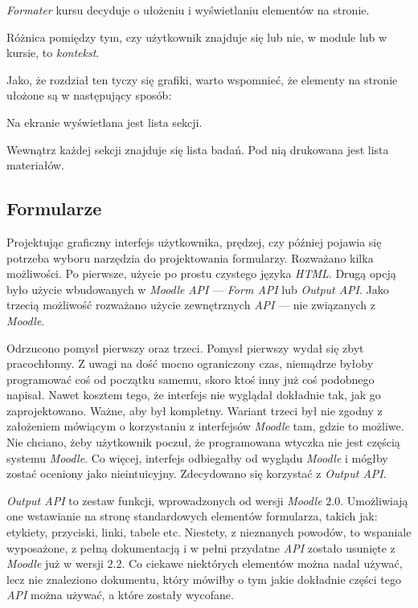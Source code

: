 \documentclass[12pt]{article}
\begin{document}
\emph{Formater} kursu decyduje o ułożeniu i wyświetlaniu elementów na stronie.

Różnica pomiędzy tym, czy użytkownik znajduje się lub nie, w module lub w kursie, to \emph{kontekst}.

Jako, że rozdział ten tyczy się grafiki, warto wspomnieć, że elementy na stronie ułożone są w następujący sposób:
\begin{description}
\item Na ekranie wyświetlana jest lista sekcji.
\item Wewnątrz każdej sekcji znajduje się lista badań. Pod nią drukowana jest lista materiałów.
\end{description}

\subsection{Formularze}
Projektując graficzny interfejs użytkownika, prędzej, czy później pojawia się potrzeba wyboru narzędzia do projektowania formularzy. Rozważano kilka możliwości. Po pierwsze, użycie po prostu czystego języka \emph{HTML}. Drugą opcją było użycie wbudowanych w \emph{Moodle} \emph{API} --- \emph{Form API} lub \emph{Output API}. Jako trzecią możliwość rozważano użycie zewnętrznych \emph{API} --- nie związanych z \emph{Moodle}.

Odrzucono pomysł pierwszy oraz trzeci. Pomysł pierwszy wydał się zbyt pracochłonny. Z uwagi na dość mocno ograniczony czas, niemądrze byłoby programować coś od początku samemu, skoro ktoś inny już coś podobnego napisał. Nawet kosztem tego, że interfejs nie wyglądał dokładnie tak, jak go zaprojektowano. Ważne, aby był kompletny. Wariant trzeci był nie zgodny z założeniem mówiącym o korzystaniu z interfejsów \emph{Moodle} tam, gdzie to możliwe. Nie chciano, żeby użytkownik poczuł, że programowana wtyczka nie jest częścią systemu \emph{Moodle}. Co więcej, interfejs odbiegałby od wyglądu \emph{Moodle} i mógłby zostać oceniony jako nieintuicyjny. Zdecydowano się korzystać z \emph{Output API}.

\emph{Output API} to zestaw funkcji, wprowadzonych od wersji \emph{Moodle} $2.0$. Umożliwiają one wstawianie na stronę standardowych elementów formularza, takich jak: etykiety, przyciski, linki, tabele etc. Niestety, z nieznanych powodów, to wspaniale wyposażone, z pełną dokumentacją i w pełni przydatne \emph{API} zostało usunięte z \emph{Moodle} już w wersji $2.2$. Co ciekawe niektórych elementów można nadal używać, lecz nie znaleziono dokumentu, który mówiłby o tym jakie dokładnie części tego \emph{API} można używać, a które zostały wycofane.
\end{document}
